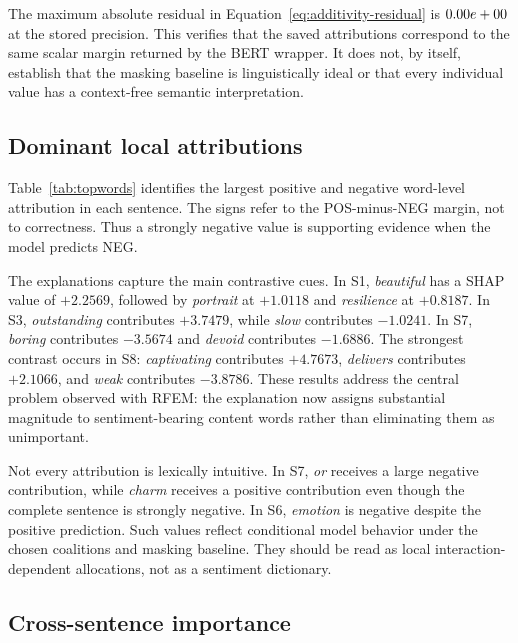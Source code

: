 \documentclass[11pt,a4paper]{article}
\begin{document}


The maximum absolute residual in Equation~\eqref{eq:additivity-residual} is
\(0.00e+00\) at the stored precision. This verifies that the saved
attributions correspond to the same scalar margin returned by the BERT wrapper.
It does not, by itself, establish that the masking baseline is linguistically
ideal or that every individual value has a context-free semantic interpretation.

\subsection{Dominant local attributions}

Table~\ref{tab:topwords} identifies the largest positive and negative word-level
attribution in each sentence. The signs refer to the POS-minus-NEG margin, not
to correctness. Thus a strongly negative value is supporting evidence when the
model predicts NEG.



The explanations capture the main contrastive cues. In S1, \emph{beautiful}
has a SHAP value of \(+2.2569\), followed by \emph{portrait} at \(+1.0118\) and
\emph{resilience} at \(+0.8187\). In S3, \emph{outstanding} contributes
\(+3.7479\), while \emph{slow} contributes \(-1.0241\). In S7,
\emph{boring} contributes \(-3.5674\) and \emph{devoid} contributes
\(-1.6886\). The strongest contrast occurs in S8: \emph{captivating} contributes
\(+4.7673\), \emph{delivers} contributes \(+2.1066\), and \emph{weak}
contributes \(-3.8786\). These results address the central problem observed with
RFEM: the explanation now assigns substantial magnitude to sentiment-bearing
content words rather than eliminating them as unimportant.

Not every attribution is lexically intuitive. In S7, \emph{or} receives a large
negative contribution, while \emph{charm} receives a positive contribution even
though the complete sentence is strongly negative. In S6, \emph{emotion} is
negative despite the positive prediction. Such values reflect conditional model
behavior under the chosen coalitions and masking baseline. They should be read
as local interaction-dependent allocations, not as a sentiment dictionary.

\subsection{Cross-sentence importance}
\end{document}
